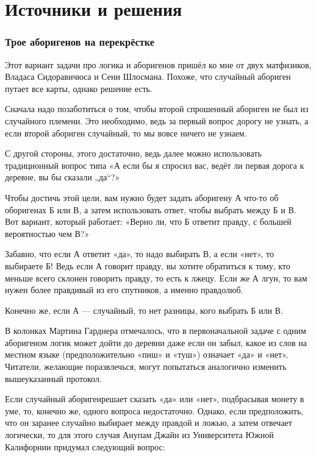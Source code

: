 \section*{Источники и решения}

\subsubsection*{Трое аборигенов на перекрёстке}

Этот вариант задачи про логика и аборигенов пришёл ко мне от двух матфизиков, Владаса Сидоравичюса и Сени Шлосмана.
Похоже, что случайный абориген путает все карты, однако решение есть.

Сначала надо позаботиться о том, чтобы второй спрошенный абориген не был из случайного племени.
Это необходимо, ведь за первый вопрос дорогу не узнать, а если второй абориген случайный, то мы вовсе ничего не узнаем.

С другой стороны, этого достаточно, ведь далее можно использовать традиционный вопрос типа «А если бы я спросил вас, ведёт ли первая дорога к деревне, вы бы сказали „да“?»

Чтобы достичь этой цели, вам нужно будет задать аборигену А что-то об оборигенах Б или В, а затем использовать ответ, чтобы выбрать между Б и В.
Вот вариант, который работает: «Верно ли, что Б ответит правду, с большей вероятностью чем В?»

Забавно, что если А ответит «да», то надо выбирать В, а если «нет», то выбираете Б!
Ведь если А говорит правду, вы хотите обратиться к тому, кто меньше всего склонен говорить правду, то есть к лжецу.
Если же А лгун, то вам нужен более правдивый из его спутников, а именно правдолюб.

Конечно же, если А --- случайный, то нет разницы, кого выбрать Б или В.

В колонках Мартина Гарднера отмечалось, что в первоначальной задаче с одним аборигеном логик может дойти до деревни даже если он забыл, какое из слов на местном языке (предположительно «пиш» и «туш») означает «да» и «нет».
Читатели, желающие поразвлечься, могут попытаться аналогично изменить вышеуказанный протокол.

Если случайный аборигенрешает сказать «да» или «нет», подбрасывая монету в уме, то, конечно же, одного вопроса недостаточно.
Однако, если предположить, что он заранее случайно выбирает между правдой и ложью, а затем отвечает логически,
то для этого случая Анупам Джайн из Университета Южной Калифорнии придумал следующий вопрос:

